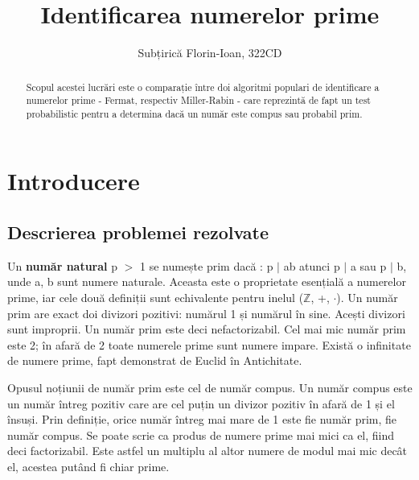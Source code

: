 \documentclass[runningheads]{llncs}
\begin{document}
\title{\textbf{Identificarea numerelor prime}}

\author{Subțirică Florin-Ioan, 322CD}


\maketitle 

\begin{abstract}
Scopul acestei lucrări este o comparație între doi algoritmi populari de identificare a numerelor prime - Fermat,
respectiv Miller-Rabin - care reprezintă de fapt un test probabilistic pentru a determina dacă un număr este compus sau probabil prim.

\end{abstract}

\section{Introducere}

\subsection{Descrierea problemei rezolvate}

\quad \quad Un \textbf{număr natural} p $>$ 1 se numește prim dacă : p $|$ ab atunci p $|$ a sau p $|$ b, unde a, b sunt
numere naturale. Aceasta este o proprietate esențială a numerelor prime, iar cele două definiții
sunt echivalente pentru inelul ($\mathbb{Z}$, +, $\cdot$). Un număr prim are exact doi divizori pozitivi: numărul 1 și
numărul în sine. Acești divizori sunt improprii. Un număr prim este deci nefactorizabil. Cel mai mic număr prim este 2;
în afară de 2 toate numerele prime sunt numere impare. Există o infinitate de numere prime, fapt demonstrat de Euclid în Antichitate.

Opusul noțiunii de număr prim este cel de număr compus. Un număr compus este un număr întreg pozitiv care are cel puțin
un divizor pozitiv în afară de 1 și el însuși. Prin definiție, orice număr întreg mai mare de 1 este fie număr prim,
fie număr compus. Se poate scrie ca produs de numere prime mai mici ca el, fiind deci factorizabil. Este astfel un multiplu
al altor numere de modul mai mic decât el, acestea putând fi chiar prime.
\end{document}
